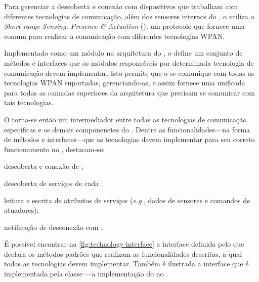 Para gerenciar a descoberta e conexão com dispositivos que trabalham com diferentes tecnologias de comunicação, além dos sensores internos do \smartphone, o \mhub utiliza o \textit{Short-range Sensing, Presence \& Actuation} (\stwopa), um protocolo que fornece uma \api comum para realizar a comunicação com diferentes tecnologias WPAN.

Implementado como um módulo na arquitetura do \middleware, o \stwopa define um conjunto de métodos e interfaces que os módulos responsáveis por determinada tecnologia de comunicação devem implementar. Isto permite que o \stwopa se comunique com todas as tecnologias WPAN suportadas, gerenciando-as, e assim fornece uma \api unificada para todas as camadas superiores da arquitetura que precisam se comunicar com tais tecnologias.

O \stwopa torna-se então um intermediador entre todas as tecnologias de comunicação específicas e os demais componenetes do \middleware. Dentre as funcionalidades---na forma de métodos e interfaces---que as tecnologias devem implementar para seu correto funcionamento no \middleware, destacam-se:

\begin{alineas}
	\item descoberta e conexão de \smartobjs;
	
	\item descoberta de serviços de cada \smartobjs;

	\item leitura e escrita de atributos de serviços (\textit{e.g.}, dados de sensores e comandos de atuadores);

	\item notificação de desconexão com \smartobjs.
\end{alineas}

É possível encontrar na \autoref{fig:technology-interface} a interface \techinterface definida pelo \stwopa que declara os métodos padrões que realizam as funcionalidades descritas, a qual todas as tecnologias devem implementar. Também é ilustrada a interface \techlistener que é implementada pela classe \stwopaservice---a implementação do \stwopa no \mhub.

